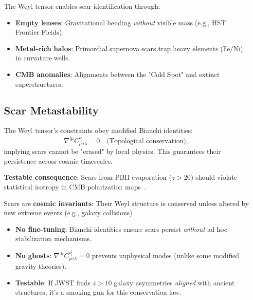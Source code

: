 \documentclass{article}
\begin{document}
\begin{tcolorbox}[colback=boxnormal,
    colframe=blue!50!black,
title=Observational Fingerprints]
The Weyl tensor enables scar identification through:
\begin{itemize}
    \item \textbf{Empty lenses}: Gravitational bending \textit{without} visible mass (e.g., HST Frontier Fields).
    \item \textbf{Metal-rich halos}: Primordial supernova scars trap heavy elements (Fe/Ni) in curvature wells.
    \item \textbf{CMB anomalies}: Alignments between the "Cold Spot" and extinct superstructures.
\end{itemize}
\end{tcolorbox}

\subsection{Scar Metastability}
The Weyl tensor's constraints obey modified Bianchi identities:
\begin{equation}
    \nabla^{[\mu} C^{\nu]}_{\rho\sigma\lambda} = 0 \quad \text{(Topological conservation)}, 
    \label{eq:bianchi_scars}
\end{equation}
implying scars cannot be "erased" by local physics. This guarantees their persistence across cosmic timescales. \par

\bigskip

\textbf{Testable consequence}:  
Scars from PBH evaporation ($z > 20$) should violate statistical isotropy in CMB polarization maps~\cite{Planck2023}.  

\begin{tcolorbox}[colback=boxnormal,
    colframe=blue!50!black,
title=Key Implication]
Scars are \textbf{cosmic invariants}: Their Weyl structure is conserved unless altered by new extreme events (e.g., galaxy collisions)
\end{tcolorbox}

\begin{tcolorbox}
[colback=boxnormal,
    colframe=blue!50!black,
title=Why This Matters]
\begin{itemize}
    \item \textbf{No fine-tuning}: Bianchi identities ensure scars persist \textit{without} ad hoc stabilization mechanisms.
    \item \textbf{No ghosts}: $\nabla^{[\mu}C^{\nu]}_{\rho\sigma\lambda} = 0$ prevents unphysical modes (unlike some modified gravity theories).
    \item \textbf{Testable}: If JWST finds $z > 10$ galaxy asymmetries \textit{aligned} with ancient structures, it's a smoking gun for this conservation law.
\end{itemize}
\end{tcolorbox}
\end{document}
